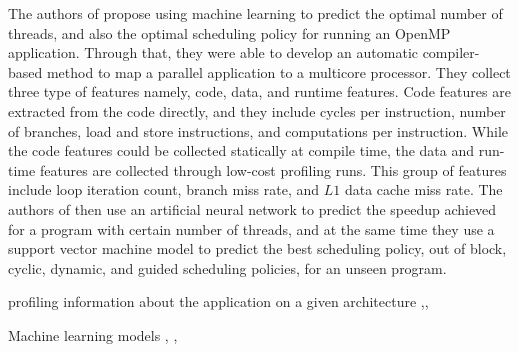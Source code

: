 The authors of \cite{wang2009mapping} propose using machine learning to predict the optimal number of threads, and also the optimal scheduling policy for running an OpenMP application. Through that, they were able to develop an automatic compiler-based method to map a parallel application to a multicore processor. They collect three type of features namely, code, data, and runtime features. Code features are extracted from the code directly, and they include cycles per instruction, number of branches, load and store instructions, and computations per instruction. While the code features could be collected statically at compile time, the data and run-time features are collected through low-cost profiling runs. This group of features include loop iteration count, branch miss rate, and $L1$ data cache miss rate. The authors of \cite{wang2009mapping} then use an artificial neural network to predict the speedup achieved for a program with certain number of threads, and at the same time they use a support vector machine model to predict the best scheduling policy, out of block, cyclic, dynamic, and guided scheduling policies, for an unseen program.



	
	
	
	
\cite{treibig2012performance} 
profiling information about the application on a given architecture
\cite{cammarota2012just},\cite{zhang2005runtime},\cite{thoman2012automatic}

Machine learning models 
\cite{singh2009real}, \cite{zomaya2001observations}, \cite{qawasmeh2015adaptive}



	

	

\cite{li2009machine}
\vspace{\baselineskip}


